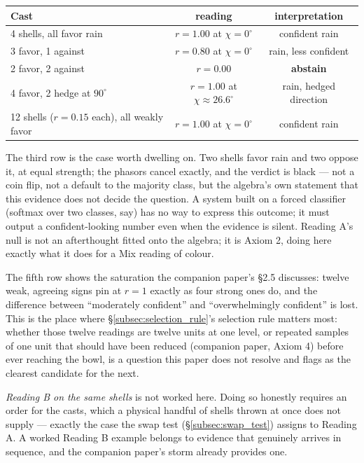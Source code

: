 \documentclass[12pt, a4paper]{article}
\begin{document}
\begin{center}
\begin{tabular}{lcc}
\hline
Cast & reading & interpretation \\
\hline
4 shells, all favor rain      & $r=1.00$ at $\chi=0^\circ$   & confident rain \\
3 favor, 1 against            & $r=0.80$ at $\chi=0^\circ$   & rain, less confident \\
2 favor, 2 against            & $r=0.00$                     & \textbf{abstain} \\
4 favor, 2 hedge at $90^\circ$ & $r=1.00$ at $\chi\approx 26.6^\circ$ & rain, hedged direction \\
12 shells ($r=0.15$ each), all weakly favor    & $r=1.00$ at $\chi=0^\circ$   & confident rain \\
\hline
\end{tabular}
\end{center}

The third row is the case worth dwelling on. Two shells favor rain and
two oppose it, at equal strength; the phasors cancel exactly, and the
verdict is black --- not a coin flip, not a default to the majority
class, but the algebra's own statement that this evidence does not
decide the question. A system built on a forced classifier (softmax
over two classes, say) has no way to express this outcome; it must
output a confident-looking number even when the evidence is silent.
Reading A's null is not an afterthought fitted onto the algebra; it is
Axiom 2, doing here exactly what it does for a Mix reading of colour.

The fifth row shows the saturation the companion paper's \S2.5
discusses: twelve weak, agreeing signs pin at $r=1$ exactly as four
strong ones do, and the difference between ``moderately confident''
and ``overwhelmingly confident'' is lost. This is the place where
\S\ref{subsec:selection_rule}'s selection rule matters most: whether
those twelve readings are twelve units at one level, or repeated
samples of one unit that should have been reduced (companion paper,
Axiom 4) before ever reaching the bowl, is a question this paper does
not resolve and flags as the clearest candidate for the next.

\emph{Reading B on the same shells} is not worked here. Doing so
honestly requires an order for the casts, which a physical handful of
shells thrown at once does not supply --- exactly the case the swap
test (\S\ref{subsec:swap_test}) assigns to Reading A. A worked Reading
B example belongs to evidence that genuinely arrives in sequence, and
the companion paper's storm already provides one.
\end{document}

